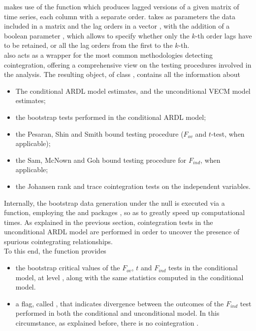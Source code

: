  makes use of the  function which produces lagged versions of a given matrix of time series, each column with a separate order.   takes as parameters the data included in a matrix  and the lag orders in a vector , with the addition of a boolean parameter , which allows to specify whether only the $k$-th order lags have to be retained, or all the lag orders from the first to the $k$-th.\\
 also acts as a wrapper for the most common methodologies detecting cointegration, offering a comprehensive view on the testing procedures involved in the analysis.
The resulting object, of class , contains all the information about
\begin{itemize}
\item The conditional ARDL model estimates, and the unconditional VECM model estimates;
    \item the bootstrap tests performed in the conditional ARDL model;
     \item the Pesaran, Shin and Smith bound testing procedure ($F_{ov}$ and $t$-test, when applicable);
    \item the Sam, McNown and Goh bound testing procedure for $F_{ind}$, when applicable;
    \item the Johansen rank and trace cointegration tests on the independent variables.
    \end{itemize}
    Internally, the bootstrap data generation under the null is executed via a  function, employing the  and  packages \citep{RCPP}, so as to greatly speed up computational times.
    As explained in the previous section, cointegration tests in the unconditional ARDL model are performed in order to uncover the presence of spurious cointegrating relationships.\\   
To this end, the function provides
    \begin{itemize}
    \item the bootstrap critical values of the $F_{ov}$, $t$ and $F_{ind}$ tests in the conditional model, at level , along with the same statistics computed in the conditional model.
    \item a flag, called , that indicates divergence between the outcomes of the $F_{ind}$ test performed in both the conditional and unconditional model. In this circumstance, as explained before, there is no cointegration \citep[see][]{bertelli2022bootstrap}.
\end{itemize}
